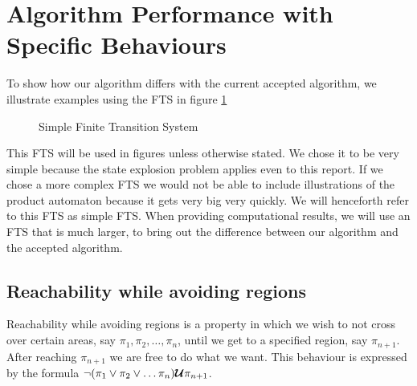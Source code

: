 \section{Algorithm Performance with Specific Behaviours}
To show how our algorithm differs with the current accepted algorithm, we illustrate examples using the FTS in figure \ref{fig:ftsEx}

\begin{figure}
\centering
{}
\caption{Simple Finite Transition System}
\label{fig:ftsEx}
\end{figure}
This FTS will be used in figures unless otherwise stated. We chose it to be very simple because the state explosion problem applies even to this report. If we chose a more complex FTS we would not be able to include illustrations of the product automaton because it gets very big very quickly. We will henceforth refer to this FTS as simple FTS. When providing computational results, we will use an FTS that is much larger, to bring out the difference between our algorithm and the accepted algorithm.


\subsection{Reachability while avoiding regions} 
Reachability while avoiding regions is a property in which we wish to not cross over certain areas, say $\pi_1, \pi_2, \dots, \pi_n$, until we get to a specified region, say $\pi_{n+1}$. After reaching $\pi_{n+1}$ we are free to do what we want. This behaviour is expressed by the formula $\neg (\pi_1 \lor \pi_2 \lor \dots \pi_n) \bm{\mathcal{U}} \pi_{n+1}$. 

